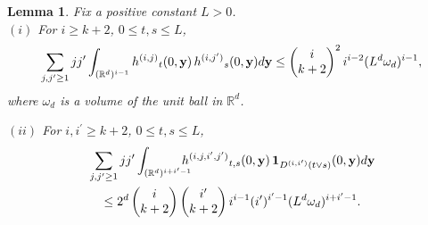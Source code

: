 \documentclass[11pt]{amsart}
\numberwithin{equation}{section}
\theoremstyle{plain}
\newtheorem{lemma}[theorem]{Lemma}
\theoremstyle{definition}
\begin{document}
\begin{lemma} \label{l:geo.lemma}
Fix a positive constant $L>0$. \\
\noindent $(i)$ For $i \geq k+2$, $0 \leq t,s \leq L$,
\begin{align*}
\sum_{j, {j^{\prime}} \geq1} j {j^{\prime}} \int_{({{\mathbb R}}^d)^{i-1}} {h^{(i,j)}}_t(0,{{\bf y}})\, {h^{(i,{j^{\prime}})}}_s(0,{{\bf y}}) d{{\bf y}} \leq \begin{pmatrix} i \\ k+2 \end{pmatrix}^2 i^{i-2} (L^d \omega_d)^{i-1},
\end{align*}
where $\omega_d$ is a volume of the unit ball in ${{\mathbb R}}^d$.
\vspace{5pt}

\noindent $(ii)$ For $i, {i^{\prime}} \geq k+2$, $0 \leq t,s \leq L$,
\begin{align*}
&\sum_{j, {j^{\prime}} \geq1} j {j^{\prime}} \int_{({{\mathbb R}}^d)^{i+{i^{\prime}}-1}} \hspace{-10pt} {h^{(i, j, i^{\prime}, j^{\prime})}}_{t,s} (0,{{\bf y}})\,  {{\bf 1}}_{{D^{(i,{i^{\prime}})}}(t\vee s)}(0,{{\bf y}}) d{{\bf y}} \\
&\quad \leq 2^{d} \begin{pmatrix} i \\ k+2 \end{pmatrix} \begin{pmatrix} {i^{\prime}} \\ k+2 \end{pmatrix} i^{i-1} ({i^{\prime}})^{{i^{\prime}}-1} (L^d \omega_d)^{i+{i^{\prime}}-1}.
\end{align*}
\end{lemma}
\end{document}
